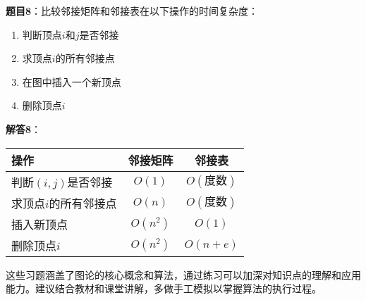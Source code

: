 \documentclass[12pt,a4paper]{amsart}
\begin{document}
\textbf{题目8}：比较邻接矩阵和邻接表在以下操作的时间复杂度：
\begin{enumerate}
    \item 判断顶点$i$和$j$是否邻接
    \item 求顶点$i$的所有邻接点
    \item 在图中插入一个新顶点
    \item 删除顶点$i$
\end{enumerate}

\textbf{解答8}：

\begin{table}[h]
\centering
\begin{tabular}{|l|c|c|}
\hline
\textbf{操作} & \textbf{邻接矩阵} & \textbf{邻接表} \\
\hline
判断$(i,j)$是否邻接 & $O(1)$ & $O(度数)$ \\
\hline
求顶点$i$的所有邻接点 & $O(n)$ & $O(度数)$ \\
\hline
插入新顶点 & $O(n^2)$ & $O(1)$ \\
\hline
删除顶点$i$ & $O(n^2)$ & $O(n+e)$ \\
\hline
\end{tabular}
\end{table}

这些习题涵盖了图论的核心概念和算法，通过练习可以加深对知识点的理解和应用能力。建议结合教材和课堂讲解，多做手工模拟以掌握算法的执行过程。
\end{document}
